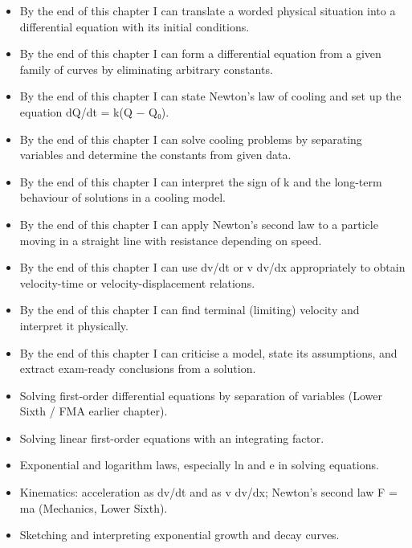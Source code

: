 \documentclass[11pt]{article}
\begin{document}
\begin{objectifs}
\begin{itemize}
\item By the end of this chapter I can translate a worded physical situation into a differential equation with its initial conditions.
\item By the end of this chapter I can form a differential equation from a given family of curves by eliminating arbitrary constants.
\item By the end of this chapter I can state Newton's law of cooling and set up the equation dQ/dt = k(Q − Q₀).
\item By the end of this chapter I can solve cooling problems by separating variables and determine the constants from given data.
\item By the end of this chapter I can interpret the sign of k and the long-term behaviour of solutions in a cooling model.
\item By the end of this chapter I can apply Newton's second law to a particle moving in a straight line with resistance depending on speed.
\item By the end of this chapter I can use dv/dt or v dv/dx appropriately to obtain velocity-time or velocity-displacement relations.
\item By the end of this chapter I can find terminal (limiting) velocity and interpret it physically.
\item By the end of this chapter I can criticise a model, state its assumptions, and extract exam-ready conclusions from a solution.
\end{itemize}
\end{objectifs}

\begin{prerequis}
\begin{itemize}
\item Solving first-order differential equations by separation of variables (Lower Sixth / FMA earlier chapter).
\item Solving linear first-order equations with an integrating factor.
\item Exponential and logarithm laws, especially ln and e in solving equations.
\item Kinematics: acceleration as dv/dt and as v dv/dx; Newton's second law F = ma (Mechanics, Lower Sixth).
\item Sketching and interpreting exponential growth and decay curves.
\end{itemize}
\end{prerequis}
\end{document}
